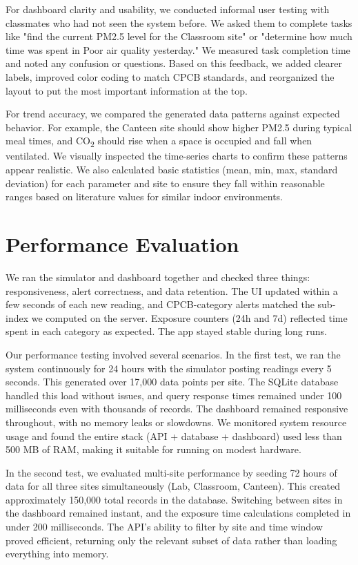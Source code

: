 \documentclass[12pt]{report}
\begin{document}
For dashboard clarity and usability, we conducted informal user testing with classmates who had not seen the system before. We asked them to complete tasks like "find the current PM2.5 level for the Classroom site" or "determine how much time was spent in Poor air quality yesterday." We measured task completion time and noted any confusion or questions. Based on this feedback, we added clearer labels, improved color coding to match CPCB standards, and reorganized the layout to put the most important information at the top.

For trend accuracy, we compared the generated data patterns against expected behavior. For example, the Canteen site should show higher PM2.5 during typical meal times, and CO\textsubscript{2} should rise when a space is occupied and fall when ventilated. We visually inspected the time-series charts to confirm these patterns appear realistic. We also calculated basic statistics (mean, min, max, standard deviation) for each parameter and site to ensure they fall within reasonable ranges based on literature values for similar indoor environments.

\section{Performance Evaluation}
We ran the simulator and dashboard together and checked three things: responsiveness, alert correctness, and data retention. The UI updated within a few seconds of each new reading, and CPCB-category alerts matched the sub-index we computed on the server. Exposure counters (24h and 7d) reflected time spent in each category as expected. The app stayed stable during long runs.

Our performance testing involved several scenarios. In the first test, we ran the system continuously for 24 hours with the simulator posting readings every 5 seconds. This generated over 17,000 data points per site. The SQLite database handled this load without issues, and query response times remained under 100 milliseconds even with thousands of records. The dashboard remained responsive throughout, with no memory leaks or slowdowns. We monitored system resource usage and found the entire stack (API + database + dashboard) used less than 500 MB of RAM, making it suitable for running on modest hardware.

In the second test, we evaluated multi-site performance by seeding 72 hours of data for all three sites simultaneously (Lab, Classroom, Canteen). This created approximately 150,000 total records in the database. Switching between sites in the dashboard remained instant, and the exposure time calculations completed in under 200 milliseconds. The API's ability to filter by site and time window proved efficient, returning only the relevant subset of data rather than loading everything into memory.
\end{document}
